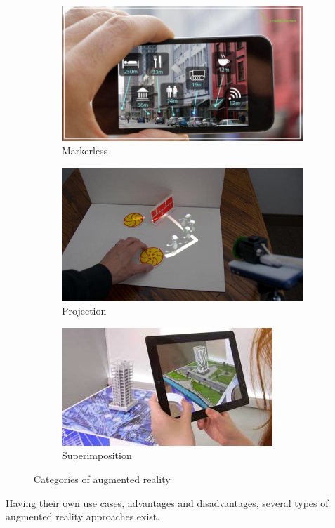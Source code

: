 \documentclass[12 pct]{report}
\begin{document}
\begin{figure}[h!]
\begin{subfigure}[b]{0.36\linewidth}
  \end{subfigure}
  \begin{subfigure}[b]{0.4\linewidth}
    \includegraphics[width=\linewidth]{marker-less}
    \caption{Markerless}
  \end{subfigure}
  \begin{subfigure}[b]{0.4\linewidth}
    \includegraphics[width=\linewidth]{projection-based}
    \caption{Projection}
  \end{subfigure}
  \begin{subfigure}[b]{0.4\linewidth}
    \includegraphics[width=\linewidth]{super-imposition}
    \caption{Superimposition}
  \end{subfigure}
  \caption{Categories of augmented reality}
  \label{fig:coffee3}
\end{figure}
Having their own use cases, advantages and disadvantages, several types of augmented reality approaches exist.
\end{document}
